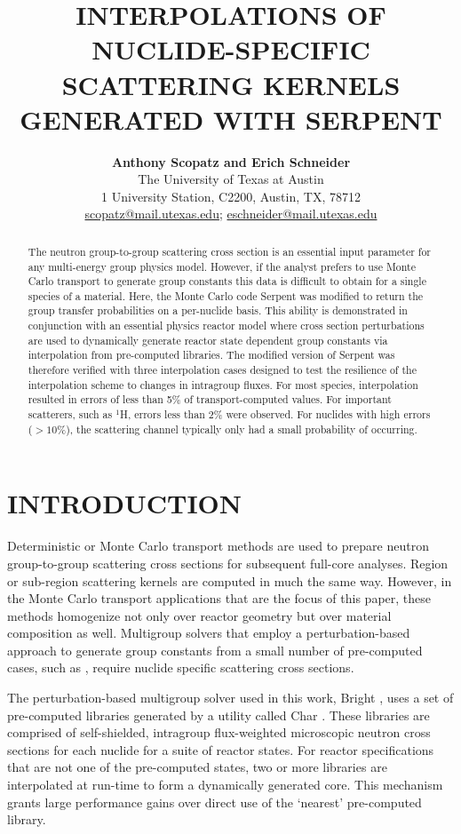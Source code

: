 \documentclass{physor2012}
\title{INTERPOLATIONS OF NUCLIDE-SPECIFIC SCATTERING KERNELS \\
       GENERATED WITH SERPENT}
\author{%
  \textbf{Anthony Scopatz and Erich Schneider} \\
  The University of Texas at Austin \\
  1 University Station, C2200, Austin, TX, 78712 \\
  \url{scopatz@mail.utexas.edu}; \url{eschneider@mail.utexas.edu} \\
}
\newcommand{\superscript}[1]{\ensuremath{^{\textrm{#1}}}}
\newcommand{\nuc}[2]{\superscript{#2}{#1}}
\begin{document}
\maketitle
\begin{abstract}
    The neutron group-to-group scattering cross section is an essential
    input parameter for any multi-energy group physics model.  However,
    if the analyst prefers to use Monte Carlo transport to generate group 
    constants this data is difficult to obtain for a single species of a material.  
    Here, the Monte Carlo code Serpent was modified to return the group transfer 
    probabilities on a per-nuclide basis.  This ability is demonstrated in conjunction with
    an essential physics reactor model where cross section perturbations
    are used to dynamically generate reactor state dependent group constants via 
    interpolation from pre-computed libraries.  The modified version of Serpent was 
    therefore verified with three interpolation cases designed to test the resilience 
    of the interpolation scheme to changes in intragroup fluxes.  For most species, 
    interpolation resulted in errors of less than 5\% of transport-computed values.  
    For important scatterers, such as \nuc{H}{1}, errors less than 2\% were observed.
    For nuclides with high errors ($>10\%$), the scattering channel typically
    only had a small probability of occurring.
\end{abstract}


\section{INTRODUCTION}
Deterministic or Monte Carlo transport methods are used to prepare neutron 
group-to-group scattering cross sections for subsequent full-core analyses.  
Region or sub-region scattering kernels are computed in much the same way.  
However, in the Monte Carlo transport applications that are the focus of 
this paper, these methods homogenize not only over reactor geometry but 
over material composition as well.  Multigroup solvers that employ a 
perturbation-based approach to generate group constants from a small 
number of pre-computed cases, such as \cite{ScopatzAnthony2011}, require 
nuclide specific scattering cross sections.

The perturbation-based multigroup solver used in this work, Bright \cite{Scopatz2011c}, uses a
set of pre-computed libraries generated by a utility called Char \cite{ScopatzAnthony2011}.
These libraries are comprised of self-shielded, intragroup flux-weighted microscopic 
neutron cross sections for each nuclide for a suite of reactor states.  For reactor
specifications that are not one of the pre-computed states, two or more libraries
are interpolated at run-time to form a dynamically generated core.  This mechanism
grants large performance gains over direct use of the `nearest' pre-computed library.
\end{document}

